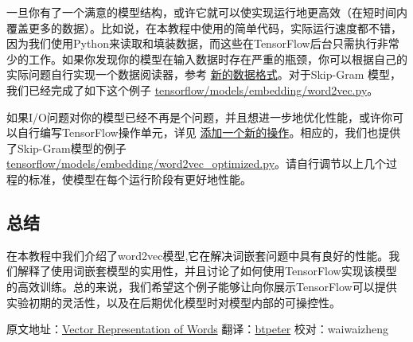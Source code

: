 一旦你有了一个满意的模型结构，或许它就可以使实现运行地更高效（在短时间内覆盖更多的数据）。比如说，在本教程中使用的简单代码，实际运行速度都不错，因为我们使用Python来读取和填装数据，而这些在TensorFlow后台只需执行非常少的工作。如果你发现你的模型在输入数据时存在严重的瓶颈，你可以根据自己的实际问题自行实现一个数据阅读器，参考
\href{tensorflow-zh/SOURCE/how_tos/new_data_formats/index.md}{新的数据格式}。对于Skip-Gram
模型，我们已经完成了如下这个例子
\href{https://tensorflow.googlesource.com/tensorflow/+/master/tensorflow/models/embedding/word2vec.py}{tensorflow/models/embedding/word2vec.py}。

如果I/O问题对你的模型已经不再是个问题，并且想进一步地优化性能，或许你可以自行编写TensorFlow操作单元，详见
\href{tensorflow-zh/SOURCE/how_tos/adding_an_op/index.md}{添加一个新的操作}。相应的，我们也提供了Skip-Gram模型的例子
\href{https://tensorflow.googlesource.com/tensorflow/+/master/tensorflow/models/embedding/word2vec_optimized.py}{tensorflow/models/embedding/word2vec\_optimized.py}。请自行调节以上几个过程的标准，使模型在每个运行阶段有更好地性能。

\subsection{总结 }\label{ux603bux7ed3}

在本教程中我们介绍了word2vec模型,它在解决词嵌套问题中具有良好的性能。我们解释了使用词嵌套模型的实用性，并且讨论了如何使用TensorFlow实现该模型的高效训练。总的来说，我们希望这个例子能够让向你展示TensorFlow可以提供实验初期的灵活性，以及在后期优化模型时对模型内部的可操控性。

原文地址：\href{https://github.com/tensorflow/tensorflow/blob/master/tensorflow/g3doc/tutorials/word2vec/index.md}{Vector
Representation of Words}
翻译：\href{https://github.com/btpeter}{btpeter} 校对：waiwaizheng


